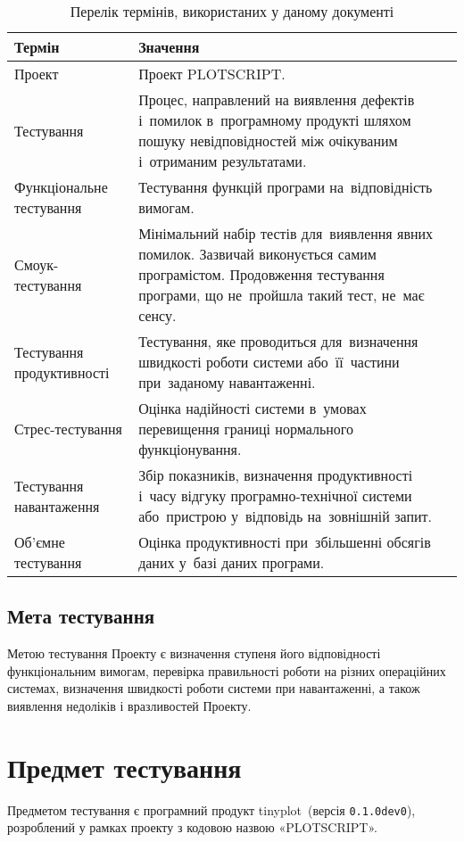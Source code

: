 \documentclass[a4paper,oneside,DIV=12,12pt]{scrartcl}
\newcommand{\progname}{tinyplot}
\newcommand{\theprojcode}{PLOTSCRIPT}
\begin{document}
			\begin{longtable}{v{0.3\textwidth}v{0.6\textwidth}}
				\toprule
					Термін & Значення\\
				\midrule
				\endhead
				\bottomrule
				\caption{Перелік термінів, використаних у даному документі\label{tab:definitions}}
				\endfoot
					Проект                    & Проект \theprojcode.\\
					Тестування                & Процес, направлений на виявлення дефектів і~помилок в~програмному продукті шляхом пошуку невідповідностей між очікуваним і~отриманим результатами. \\
					Функціональне тестування  & Тестування функцій програми на~відповідність вимогам.\\
					Смоук-тестування          & Мінімальний набір тестів для~виявлення явних помилок. Зазвичай виконується самим програмістом. Продовження тестування програми, що не~пройшла такий тест, не~має сенсу.\\
					Тестування продуктивності & Тестування, яке проводиться для~визначення швидкості роботи системи або~її~частини при~заданому навантаженні.\\
					Стрес-тестування          & Оцінка надійності системи в~умовах перевищення границі нормального функціонування.\\
					Тестування навантаження   & Збір показників, визначення продуктивності і~часу відгуку програмно-технічної системи або~пристрою у~відповідь на~зовнішній запит. \\
					Об'ємне тестування        & Оцінка продуктивності при~збільшенні обсягів даних у~базі даних програми.\\
			\end{longtable}
			
		\subsection{Мета тестування}
			Метою тестування Проекту є визначення ступеня його відповідності функціональним вимогам, перевірка правильності роботи на різних операційних системах, визначення швидкості роботи системи при навантаженні, а також виявлення недоліків і вразливостей Проекту.
			
	\section{Предмет тестування}
		Предметом тестування є програмний продукт \progname~(версія \verb|0.1.0dev0|), розроблений у рамках проекту з кодовою назвою «\theprojcode».
		
\end{document}
